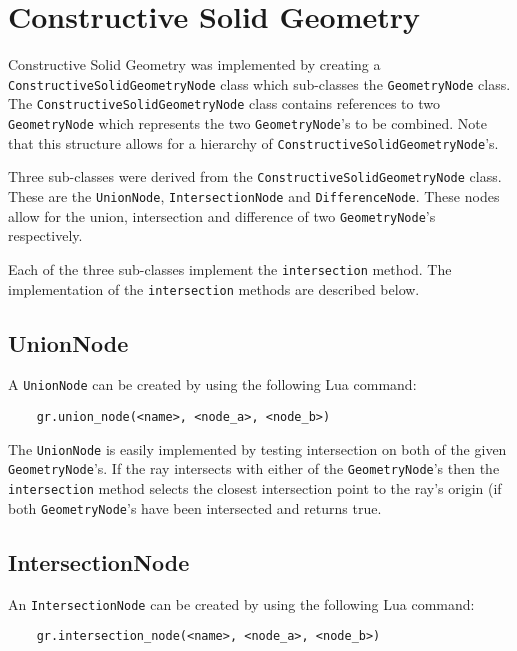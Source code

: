 \section{Constructive Solid Geometry}

Constructive Solid Geometry was implemented by creating a
\newline \verb|ConstructiveSolidGeometryNode| class which sub-classes the 
\newline \verb|GeometryNode| class. The \verb|ConstructiveSolidGeometryNode| class 
contains references to two \verb|GeometryNode| which represents the two
\newline \verb|GeometryNode|'s to be combined. Note that this structure allows for a
hierarchy of \verb|ConstructiveSolidGeometryNode|'s.

Three sub-classes were derived from the \newline \verb|ConstructiveSolidGeometryNode|
class. These are the \verb|UnionNode|, \verb|IntersectionNode| and
\verb|DifferenceNode|. These nodes allow for the union, intersection and
difference of two \verb|GeometryNode|'s respectively.

Each of the three sub-classes implement the \verb|intersection| method. The
implementation of the \verb|intersection| methods are described below.

\subsection*{UnionNode}
A \verb|UnionNode| can be created by using the following Lua command: 
\begin{verbatim}
    gr.union_node(<name>, <node_a>, <node_b>)
\end{verbatim}

The \verb|UnionNode| is easily implemented by testing intersection on both of
the given \verb|GeometryNode|'s. If the ray intersects with either of the 
\verb|GeometryNode|'s then the \verb|intersection| method selects the closest
intersection point to the ray's origin (if both \verb|GeometryNode|'s have been 
intersected  and returns true. 

\subsection*{IntersectionNode}
An \verb|IntersectionNode| can be created by using the following Lua command:
\begin{verbatim}
    gr.intersection_node(<name>, <node_a>, <node_b>)
\end{verbatim}

